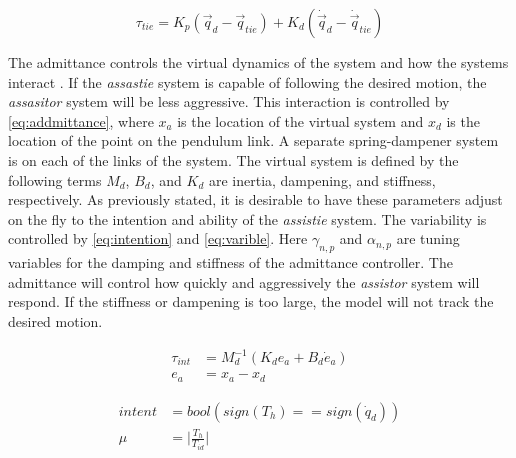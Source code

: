 \begin{equation}
        \tau_{tie} = K_p( \vec{q}_d - \vec{q}_{tie} ) + K_d ( \dot{\vec{q}}_d - \dot{\vec{q}}_{tie} ) 
    \label{eq:PDcnrl}
\end{equation}

The admittance controls the virtual dynamics of the system and how the systems interact \cite{faulring2005haptic}. If the \textit{assastie} system is capable of following the desired motion, the \textit{assasitor} system will be less aggressive. This interaction is controlled by \autoref{eq:addmittance}, where $x_a$ is the location of the virtual system and $x_d$ is the location of the point on the pendulum link. A separate spring-dampener system is on each of the links of the system. The virtual system is defined by the following terms $M_d$, $B_d$, and $K_d$ are inertia, dampening, and stiffness, respectively. As previously stated, it is desirable to have these parameters adjust on the fly to the intention and ability of the \textit{assistie} system. The variability is controlled by \autoref{eq:intention} and \autoref{eq:varible}. Here $\gamma_{n,p}$ and $\alpha_{n,p}$ are tuning variables for the damping and stiffness of the admittance controller. The admittance will control how quickly and aggressively the \textit{assistor} system will respond. If the stiffness or dampening is too large, the model will not track the desired motion.   

\begin{equation}
    \begin{aligned}
        \tau_{int} &= M_d^{-1}( K_d e_a + B_d \dot{e}_a)  \\
        e_a &= x_a - x_d 
    \end{aligned}
    \label{eq:addmittance}
\end{equation}

\begin{equation}
    \begin{aligned}
         intent &= bool ( sign(T_h) == sign(\dot{q}_d) ) \\
         \mu &= \Big|\frac{T_h}{T_{id}} \Big|
    \end{aligned}
    \label{eq:intention}
\end{equation}



